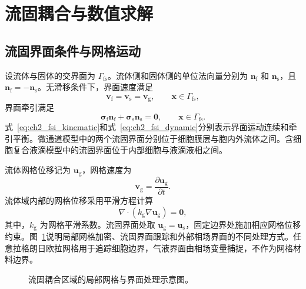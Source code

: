 \section{流固耦合与数值求解}

\subsection{流固界面条件与网格运动}

设流体与固体的交界面为 $\Gamma_{\mathrm{fs}}$。流体侧和固体侧的单位法向量分别为 $\boldsymbol{n}_{\mathrm f}$ 和 $\boldsymbol{n}_{\mathrm s}$，且 $\boldsymbol{n}_{\mathrm f}=-\boldsymbol{n}_{\mathrm s}$。无滑移条件下，界面速度满足
\begin{equation}
\boldsymbol{v}_{\mathrm f}
=
\boldsymbol{v}_{\mathrm s}
=
\boldsymbol{v}_{\mathrm g},
\qquad
\boldsymbol{x}\in\Gamma_{\mathrm{fs}},
\label{eq:ch2_fsi_kinematic}
\end{equation}
界面牵引满足
\begin{equation}
\boldsymbol{\sigma}_{\mathrm f}\boldsymbol{n}_{\mathrm f}
+
\boldsymbol{\sigma}_{\mathrm s}\boldsymbol{n}_{\mathrm s}
=
\boldsymbol{0},
\qquad
\boldsymbol{x}\in\Gamma_{\mathrm{fs}}.
\label{eq:ch2_fsi_dynamic}
\end{equation}
式~\eqref{eq:ch2_fsi_kinematic}和式~\eqref{eq:ch2_fsi_dynamic}分别表示界面运动连续和牵引平衡\cite{hou2012numerical}。微通道模型中的两个流固界面分别位于细胞膜层与胞内外流体之间。含细胞复合液滴模型中的流固界面位于内部细胞与液滴液相之间。

流体网格位移记为 $\boldsymbol{u}_{\mathrm g}$，网格速度为
\begin{equation}
\boldsymbol{v}_{\mathrm g}
=
\frac{\partial\boldsymbol{u}_{\mathrm g}}{\partial t}.
\label{eq:ch2_mesh_velocity}
\end{equation}
流体域内部的网格位移采用平滑方程计算
\begin{equation}
\nabla\cdot
\left(k_{\mathrm g}\nabla\boldsymbol{u}_{\mathrm g}\right)
=
\boldsymbol{0},
\label{eq:ch2_mesh_smoothing}
\end{equation}
其中，$k_{\mathrm g}$ 为网格平滑系数。流固界面处取 $\boldsymbol{u}_{\mathrm g}=\boldsymbol{u}_{\mathrm s}$，固定边界处施加相应网格位移约束。图~\ref{fig:ch2_ale_mesh}说明局部网格加密、流固界面跟踪和外部相场界面的不同处理方式。任意拉格朗日欧拉网格用于追踪细胞边界，气液界面由相场变量捕捉，不作为网格材料边界。

\begin{figure}[htbp]
  \centering
  
  \caption{流固耦合区域的局部网格与界面处理示意图。}
  \label{fig:ch2_ale_mesh}
\end{figure}

